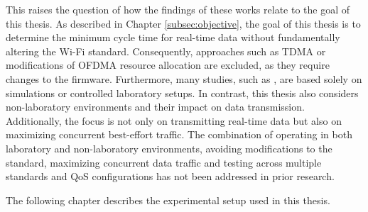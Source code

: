 This raises the question of how the findings of these works relate to the goal of this thesis.  
As described in Chapter \ref{subsec:objective}, the goal of this thesis is to determine the minimum cycle time for real-time data without fundamentally altering the Wi-Fi standard.  
Consequently, approaches such as \ac{TDMA} or modifications of \ac{OFDMA} resource allocation are excluded, as they require changes to the firmware.  
Furthermore, many studies, such as \cite{10.1007/978-3-031-40564-8_14}, are based solely on simulations or controlled laboratory setups.  
In contrast, this thesis also considers non-laboratory environments and their impact on data transmission.  
Additionally, the focus is not only on transmitting real-time data but also on maximizing concurrent best-effort traffic.  
The combination of operating in both laboratory and non-laboratory environments, avoiding modifications to the standard, maximizing concurrent data traffic and testing across multiple standards and \ac{QoS} configurations has not been addressed in prior research.  

The following chapter describes the experimental setup used in this thesis.  
